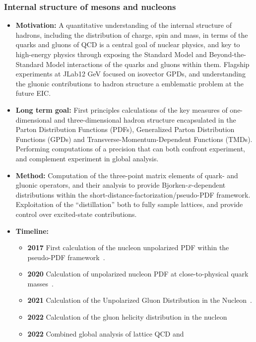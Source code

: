 \documentclass[12pt,hyperpdf]{article}
\begin{document}
    
\subsubsection{Internal structure of mesons and nucleons}\label{sec:meshadstruct}
\begin{itemize}
   \item{\bf Motivation:} A quantitative understanding of the internal
     structure of hadrons, including the distribution of charge, spin
     and mass, in terms of the quarks and gluons of QCD is a central
     goal of nuclear physics, and key to high-energy physics through
     exposing the Standard Model and Beyond-the-Standard Model
     interactions of the quarks and gluons within them.  Flagship
     experiments at JLab\@12 GeV focused on isovector GPDs, and
     understanding the gluonic contributions to hadron structure a
     emblematic problem at the future EIC.
   \item{\bf Long term goal:} First principles calculations of the key
     measures of one-dimensional and three-dimensional hadron
     structure encapsulated in the Parton Distribution Functions (PDFs),
     Generalized Parton Distribution Functions (GPDs) and
     Transverse-Momentum-Dependent Functions (TMDs).  Performing
     computations of a precision that can both confront experiment,
     and complement experiment in global analysis.
   \item{\bf Method:} Computation of the three-point matrix elements of quark- and
     gluonic operators, and their analysis to provide
     Bjorken-$x$-dependent distributions within the
     short-distance-factorization/pseudo-PDF framework.  Exploitation
     of the ``distillation'' both to fully sample lattices, and
     provide control over excited-state contributions.
\item{\bf Timeline:}
\begin{itemize}
   \item{\bf 2017} First calculation of the nucleon unpolarized PDF within
     the pseudo-PDF framework~\cite{Orginos:2017kos}.
   \item{\bf 2020} Calculation of unpolarized nucleon PDF at close-to-physical
     quark masses~\cite{Joo:2020spy}.
   \item{\bf 2021} Calculation of the Unpolarized Gluon Distribution in
     the Nucleon~\cite{HadStruc:2021wmh}.
   \item{\bf 2022} Calculation of the gluon helicity distribution in
     the nucleon~\cite{HadStruc:2022yaw}
   \item{\bf 2022} Combined global analysis of lattice QCD and

\end{itemize}
\end{itemize}
\end{document}
